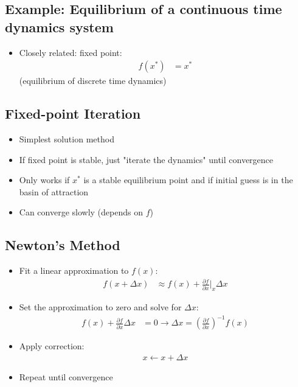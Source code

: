 \documentclass[11pt]{article}
\begin{document}
\subsection{Example: Equilibrium of a continuous time dynamics system}
\begin{itemize}
    \item Closely related: fixed point:
    \begin{align*}
        f(x^*) &= x^*
    \end{align*}
    (equilibrium of discrete time dynamics)
\end{itemize}

\subsection{Fixed-point Iteration}
\begin{itemize}
    \item Simplest solution method
    \item If fixed point is stable, just "iterate the dynamics" until convergence
    \item Only works if $x^*$ is a stable equilibrium point and if initial guess is in the basin of attraction
    \item Can converge slowly (depends on $f$)
\end{itemize}

\subsection{Newton's Method}
\begin{itemize}
    \item Fit a linear approximation to $f(x)$:
    \begin{align*}
        f(x+\Delta x) &\approx f(x) + \frac{\partial f}{\partial x}|_x\Delta x
    \end{align*}
    \item Set the approximation to zero and solve for $\Delta x$:
    \begin{align*}
        f(x) + \frac{\partial f}{\partial x}\Delta x &= 0 \rightarrow \Delta x = \left(\frac{\partial f}{\partial x}\right)^{-1}f(x)
    \end{align*}
 \item Apply correction:
 \begin{align*}
     x \leftarrow x + \Delta x
 \end{align*}
 \item Repeat until convergence
\end{itemize}
\end{document}
